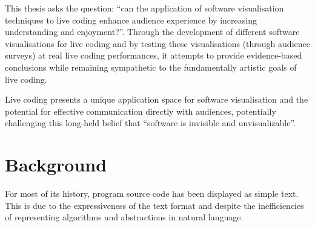 This thesis asks the question: ``can the application of software
visualisation techniques to live coding enhance audience experience by
increasing understanding and enjoyment?''. Through the development of
different software visualisations for live coding and by testing these
visualisations (through audience surveys) at real live coding
performances, it attempts to provide evidence-based conclusions while
remaining sympathetic to the fundamentally artistic goals of live
coding.

Live coding presents a unique application space for software
visualisation and the potential for effective communication directly
with audiences, potentially challenging this long-held belief that
``software is invisible and unvisualizable''.

















\section{Background}

For most of its history, program source code has been displayed as simple text. This is due to the expressiveness of the text format and despite the inefficiencies of representing algorithms and abstractions in natural language.

